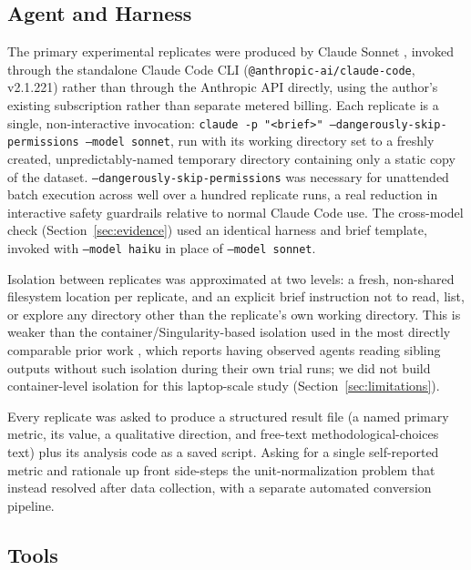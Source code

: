 \documentclass{article}
\begin{document}
\subsection{Agent and Harness}

The primary experimental replicates were produced by Claude Sonnet \citep{anthropic2026},
invoked through the standalone Claude Code CLI (\texttt{@anthropic-ai/claude-code},
v2.1.221) rather than through the Anthropic API directly, using the author's existing
subscription rather than separate metered billing. Each replicate is a single,
non-interactive invocation:
\texttt{claude -p "<brief>" --dangerously-skip-permissions --model sonnet}, run with its
working directory set to a freshly created, unpredictably-named temporary directory
containing only a static copy of the dataset. \texttt{--dangerously-skip-permissions} was
necessary for unattended batch execution across well over a hundred replicate runs, a real
reduction in interactive safety guardrails relative to normal Claude Code use. The
cross-model check (Section~\ref{sec:evidence}) used an identical harness and brief
template, invoked with \texttt{--model haiku} in place of \texttt{--model sonnet}.

Isolation between replicates was approximated at two levels: a fresh, non-shared
filesystem location per replicate, and an explicit brief instruction not to read, list, or
explore any directory other than the replicate's own working directory. This is weaker
than the container/Singularity-based isolation used in the most directly comparable prior
work \citep{gaoxiao2026}, which reports having observed agents reading sibling outputs
without such isolation during their own trial runs; we did not build container-level
isolation for this laptop-scale study (Section~\ref{sec:limitations}).

Every replicate was asked to produce a structured result file (a named primary metric, its
value, a qualitative direction, and free-text methodological-choices text) plus its
analysis code as a saved script. Asking for a single self-reported metric and rationale up
front side-steps the unit-normalization problem that \citet{gaoxiao2026} instead resolved
after data collection, with a separate automated conversion pipeline.

\subsection{Tools}
\end{document}
